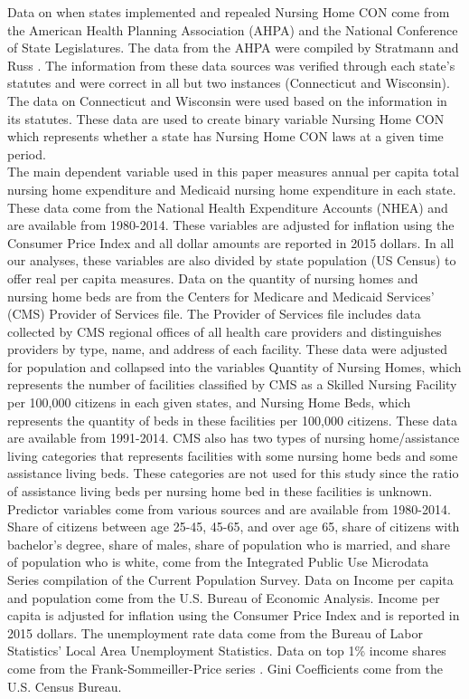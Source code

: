 \documentclass[../Main.tex]{subfiles}
\begin{document}
Data on when states implemented and repealed Nursing Home CON come from the American Health Planning Association (AHPA) and the National Conference of State Legislatures. The data from the AHPA were compiled by Stratmann and Russ \citep{stratmann2014certificate}. The information from these data sources was verified through each state’s statutes and were correct in all but two instances (Connecticut and Wisconsin). The data on Connecticut and Wisconsin were used based on the information in its statutes. These data are used to create binary variable Nursing Home CON which represents whether a state has Nursing Home CON laws at a given time period.\\
\indent The main dependent variable used in this paper measures annual per capita total nursing home expenditure and Medicaid nursing home expenditure in each state. These data come from the National Health Expenditure Accounts (NHEA) and are available from 1980-2014. These variables are adjusted for inflation using the Consumer Price Index and all dollar amounts are reported in 2015 dollars. In all our analyses, these variables are also divided by state population (US Census) to offer real per capita measures. Data on the quantity of nursing homes and nursing home beds are from the Centers for Medicare and Medicaid Services’ (CMS) Provider of Services file. The Provider of Services file includes data collected by CMS regional offices of all health care providers and distinguishes providers by type, name, and address of each facility. These data were adjusted for population and collapsed into the variables Quantity of Nursing Homes, which represents the number of facilities classified by CMS as a Skilled Nursing Facility per 100,000 citizens in each given states, and Nursing Home Beds, which represents the quantity of beds in these facilities per 100,000 citizens. These data are available from 1991-2014. CMS also has two types of nursing home/assistance living categories that represents facilities with some nursing home beds and some assistance living beds. These categories are not used for this study since the ratio of assistance living beds per nursing home bed in these facilities is unknown. \\
\indent Predictor variables come from various sources and are available from 1980-2014. Share of citizens between age 25-45, 45-65, and over age 65, share of citizens with bachelor’s degree, share of males, share of population who is married, and share of population who is white, come from the Integrated Public Use Microdata Series compilation of the Current Population Survey. Data on Income per capita and population come from the U.S. Bureau of Economic Analysis. Income per capita is adjusted for inflation using the Consumer Price Index and is reported in 2015 dollars. The unemployment rate data come from the Bureau of Labor Statistics’ Local Area Unemployment Statistics. Data on top 1\% income shares come from the Frank-Sommeiller-Price series \citep{frank2015performance}. Gini Coefficients come from the U.S. Census Bureau.
\end{document}
